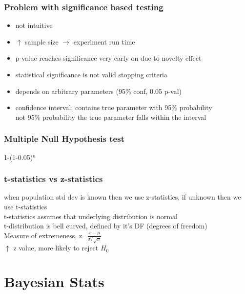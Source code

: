 \documentclass{beamer}
\begin{document}
\begin{frame}\frametitle{Problem with significance based testing}
	\begin{itemize}
		\item not intuitive
		\item $\uparrow$ sample size $\rightarrow$ experiment run time
		\item p-value reaches significance very early on due to novelty effect
		\item statistical significance is not valid stopping criteria
		\item depends on arbitrary parameters (95\% conf, 0.05 p-val)
		\item confidence interval: contains true parameter with 95\% probability\\
		not 95\% probability the true parameter falls within the interval\\
		
	\end{itemize}
\end{frame}


\begin{frame}\frametitle{Multiple Null Hypothesis test}
	1-(1-0.05)$^n$
\end{frame}

\begin{frame}\frametitle{t-statistics vs z-statistics}

when population std dev is known then we use z-statistics, if unknown then we use t-statistics\\
t-statistics assumes that underlying distribution is normal\\
t-distribution is bell curved, defined by it's DF (degrees of freedom)\\
Measure of extremeness, z=$\frac{\bar{x}-\mu}{\sigma/\sqrt{n}}$\\
$\uparrow$ z value, more likely to reject $H_0$

\end{frame}





\section{Bayesian Stats}
\end{document}
